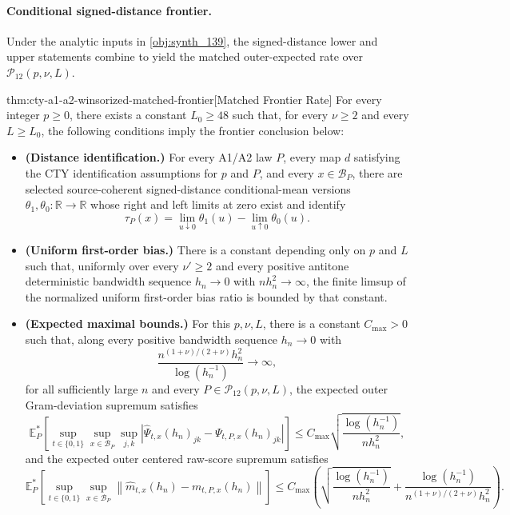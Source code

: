 \paragraph{Conditional signed-distance frontier.}
Under the analytic inputs in \cref{obj:synth_139}, the signed-distance lower and upper statements combine to yield the matched outer-expected rate over \(\mathcal P_{12}(p,\nu,L)\).

\begin{theoremv}{thm:cty-a1-a2-winsorized-matched-frontier}[Matched Frontier Rate]
For every integer \(p\geq 0\), there exists a constant \(L_0\geq 48\) such that, for every \(\nu\geq 2\) and every \(L\geq L_0\), the following conditions imply the frontier conclusion below:
\begin{itemize}
\item \textbf{(Distance identification.)} For every A1/A2 law \(P\), every map \(d\) satisfying the CTY identification assumptions for \(p\) and \(P\), and every \(x\in\mathcal B_P\), there are selected source-coherent signed-distance conditional-mean versions \(\theta_1,\theta_0:\mathbb R\to\mathbb R\) whose right and left limits at zero exist and identify
\[
\tau_P(x)=\lim_{u\downarrow 0}\theta_1(u)-\lim_{u\uparrow 0}\theta_0(u).
\]
\item \textbf{(Uniform first-order bias.)} There is a constant depending only on \(p\) and \(L\) such that, uniformly over every \(\nu'\geq 2\) and every positive antitone deterministic bandwidth sequence \(h_n\to0\) with \(n h_n^2\to\infty\), the finite limsup of the normalized uniform first-order bias ratio is bounded by that constant.
\item \textbf{(Expected maximal bounds.)} For this \(p,\nu,L\), there is a constant \(C_{\mathrm{max}}>0\) such that, along every positive bandwidth sequence \(h_n\to0\) with
\[
\frac{n^{(1+\nu)/(2+\nu)}h_n^2}{\log(h_n^{-1})}\to\infty,
\]
for all sufficiently large \(n\) and every \(P\in\mathcal P_{12}(p,\nu,L)\), the expected outer Gram-deviation supremum satisfies
\[
\mathbb E_P^*\!\left[
\sup_{t\in\{0,1\}}\sup_{x\in\mathcal B_P}\sup_{j,k}
\left|\widehat\Psi_{t,x}(h_n)_{jk}-\Psi_{t,P,x}(h_n)_{jk}\right|
\right]
\leq
C_{\mathrm{max}}
\sqrt{\frac{\log(h_n^{-1})}{n h_n^2}},
\]
and the expected outer centered raw-score supremum satisfies
\[
\mathbb E_P^*\!\left[
\sup_{t\in\{0,1\}}\sup_{x\in\mathcal B_P}
\left\|\widehat m_{t,x}(h_n)-m_{t,P,x}(h_n)\right\|
\right]
\leq
C_{\mathrm{max}}\left(
\sqrt{\frac{\log(h_n^{-1})}{n h_n^2}}
+
\frac{\log(h_n^{-1})}{n^{(1+\nu)/(2+\nu)}h_n^2}
\right).
\]

\end{itemize}
\end{theoremv}
